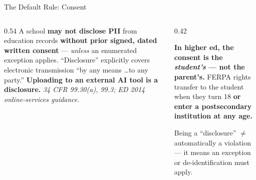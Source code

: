 \documentclass[aspectratio=169, 10pt]{beamer}
\newcommand{\cmcite}[1]{{\scriptsize\color{CoolGray}\textit{#1}}}
\begin{document}
\begin{frame}{The Default Rule: Consent}
\begin{columns}[T]
\begin{column}{0.54\textwidth}
\small A school \textbf{may not disclose PII} from education records \textbf{without prior signed, dated written consent} --- \emph{unless} an enumerated exception applies.
\vskip5pt
``Disclosure'' explicitly covers electronic transmission ``by any means \ldots to any party.'' \textbf{Uploading to an external AI tool is a disclosure.}
\vskip4pt
\cmcite{34 CFR 99.30(a), 99.3; ED 2014 online-services guidance.}
\end{column}
\begin{column}{0.42\textwidth}
\begin{tcolorbox}[accentbox]
\small
\textbf{In higher ed, the consent is the \emph{student's} --- not the parent's.}
\vskip4pt
FERPA rights transfer to the student when they turn 18 \textbf{or enter a postsecondary institution at any age.}
\end{tcolorbox}
\vskip4pt
\begin{tcolorbox}[quotebox, top=3pt, bottom=3pt]
\scriptsize Being a ``disclosure'' $\neq$ automatically a violation --- it means an exception or de-identification must apply.
\end{tcolorbox}
\end{column}
\end{columns}
\end{frame}
\end{document}
